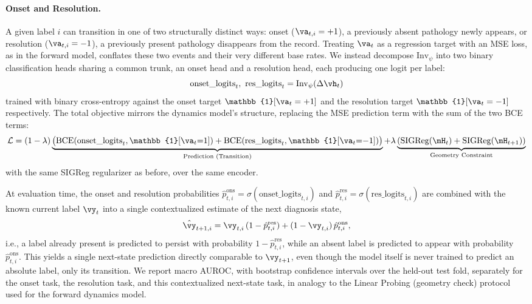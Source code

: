 \paragraph{Onset and Resolution.}
A given label $i$ can transition in one of two structurally distinct ways: onset ($\va_{t,i}=+1$), a previously absent pathology newly appears, or resolution ($\va_{t,i}=-1$), a previously present pathology disappears from the record. Treating $\va_t$ as a regression target with an MSE loss, as in the forward model, conflates these two events and their very different base rates. We instead decompose $\text{Inv}_\psi$ into two binary classification heads sharing a common trunk, an onset head and a resolution head, each producing one logit per label:
$$ \text{onset\_logits}_t,\ \text{res\_logits}_t = \text{Inv}_\psi(\Delta\vh_t) $$
trained with binary cross-entropy against the onset target $\mathbb{1}[\va_t=+1]$ and the resolution target $\mathbb{1}[\va_t=-1]$ respectively. The total objective mirrors the dynamics model's structure, replacing the MSE prediction term with the sum of the two BCE terms:
$$ \mathcal{L} = (1-\lambda)\underbrace{\big(\text{BCE}(\text{onset\_logits}_t, \mathbb{1}[\va_t{=}1]) + \text{BCE}(\text{res\_logits}_t, \mathbb{1}[\va_t{=}{-1}])\big)}_{\text{Prediction (Transition)}} + \lambda \underbrace{(\text{SIGReg}(\mH_t) + \text{SIGReg}(\mH_{t+1}))}_{\text{Geometry Constraint}} $$
with the same SIGReg regularizer as before, over the same encoder.

At evaluation time, the onset and resolution probabilities $\hat p^{\text{ons}}_{t,i} = \sigma(\text{onset\_logits}_{t,i})$ and $\hat p^{\text{res}}_{t,i} = \sigma(\text{res\_logits}_{t,i})$ are combined with the known current label $\vy_t$ into a single contextualized estimate of the next diagnosis state,
$$ \hat{\vy}_{t+1,i} = \vy_{t,i}\,(1-\hat p^{\text{res}}_{t,i}) + (1-\vy_{t,i})\,\hat p^{\text{ons}}_{t,i}, $$
i.e., a label already present is predicted to persist with probability $1-\hat p^{\text{res}}_{t,i}$, while an absent label is predicted to appear with probability $\hat p^{\text{ons}}_{t,i}$. This yields a single next-state prediction directly comparable to $\vy_{t+1}$, even though the model itself is never trained to predict an absolute label, only its transition. We report macro AUROC, with bootstrap confidence intervals over the held-out test fold, separately for the onset task, the resolution task, and this contextualized next-state task, in analogy to the Linear Probing (geometry check) protocol used for the forward dynamics model.
